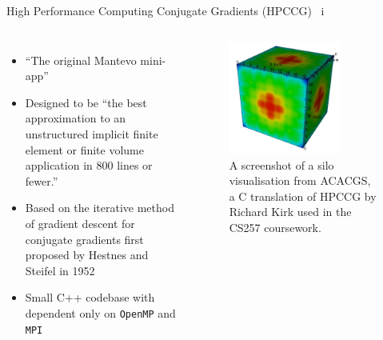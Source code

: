 \documentclass[10pt,aspectratio=169]{beamer}
\begin{document}
\begin{frame}{High Performance Computing Conjugate Gradients (HPCCG) \ i}
    \begin{columns}[onlytextwidth]
            \begin{itemize}
                \item ``The original Mantevo mini-app'' \cite{MantevoHPCCG2023}
                \vspace{0.5cm}
                \item Designed to be ``the best approximation to an unstructured implicit finite element or finite volume application in 800 lines or fewer.'' \cite{heroux2013mantevo}
                \item Based on the iterative method of gradient descent for conjugate gradients first proposed by Hestnes and Steifel in 1952 \cite{hestenesMethodsConjugateGradients1952}
                \item Small C++ codebase with dependent only on \texttt{OpenMP} and \texttt{MPI}
            \end{itemize}
            \begin{figure}[H]
                \includegraphics[width=0.75\textwidth]{images/acacgs_silo_output.png}
                \captionsetup{width=.9\linewidth}
                \caption{A screenshot of a silo visualisation from ACACGS, a C translation of HPCCG by Richard Kirk used in the CS257 coursework.}
                \label{fig:warwick_mantevo_link}
            \end{figure}
    \end{columns}
\end{frame}
\end{document}
